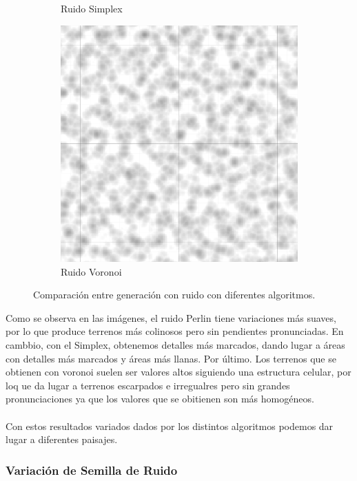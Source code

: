 \begin{figure}[ht]
\begin{subfigure}{0.3\linewidth}
        \caption{Ruido Simplex}
    \end{subfigure}
    \hfill
    \begin{subfigure}{0.3\linewidth}
        \centering
        \includegraphics[width=\linewidth]{img/codes/Voronoi.png}
        \caption{Ruido Voronoi}
    \end{subfigure}
    \caption{Comparación entre generación con ruido con diferentes algoritmos.}
\end{figure}

Como se observa en las imágenes, el ruido Perlin tiene variaciones más suaves, por lo que produce terrenos más colinosos pero sin pendientes pronunciadas. En cambbio, con el Simplex, obtenemos detalles más marcados, dando lugar a áreas con detalles más marcados y áreas más llanas. Por último. Los terrenos que se obtienen con voronoi suelen ser valores altos siguiendo una estructura celular, por loq ue da lugar a terrenos escarpados e irregualres pero sin grandes pronunciaciones ya que los valores que se obitienen son más homogéneos.
\\
\\Con estos resultados variados dados por los distintos algoritmos podemos dar lugar a diferentes paisajes.

\subsubsection{Variación de Semilla de Ruido}

